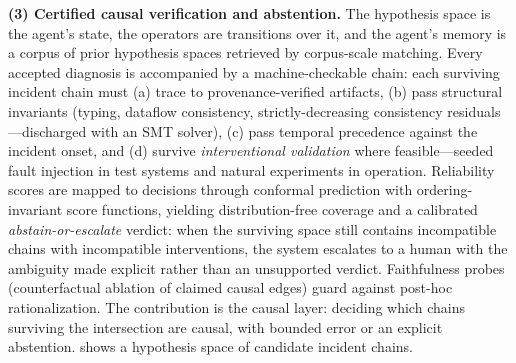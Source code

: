 \documentclass[12pt]{article}
\begin{document}
\textbf{(3) Certified causal verification and abstention.} The hypothesis space is the agent's state, the operators are transitions over it, and the agent's memory is a corpus of prior hypothesis spaces retrieved by corpus-scale matching. Every accepted diagnosis is accompanied by a machine-checkable chain: each surviving incident chain must (a) trace to provenance-verified artifacts, (b) pass structural invariants (typing, dataflow consistency, strictly-decreasing consistency residuals---discharged with an SMT solver), (c) pass temporal precedence against the incident onset, and (d) survive \emph{interventional validation} where feasible---seeded fault injection in test systems and natural experiments in operation. Reliability scores are mapped to decisions through conformal prediction with ordering-invariant score functions, yielding distribution-free coverage and a calibrated \emph{abstain-or-escalate} verdict: when the surviving space still contains incompatible chains with incompatible interventions, the system escalates to a human with the ambiguity made explicit rather than an unsupported verdict. Faithfulness probes (counterfactual ablation of claimed causal edges) guard against post-hoc rationalization. The contribution is the causal layer: deciding which chains surviving the intersection are causal, with bounded error or an explicit abstention.  shows a hypothesis space of candidate incident chains.
\end{document}
